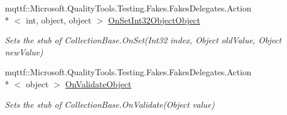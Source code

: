 \begin{DoxyCompactItemize}
mqttf\-::\-Microsoft.\-Quality\-Tools.\-Testing.\-Fakes.\-Fakes\-Delegates.\-Action\\*
$<$ int, object, object $>$ \hyperlink{class_system_1_1_security_1_1_cryptography_1_1_x509_certificates_1_1_fakes_1_1_stub_x509_certificate2_collection_a1aa75c2c759be2e9b4ecc430de4595ac}{On\-Set\-Int32\-Object\-Object}
\begin{DoxyCompactList}\small\item\em Sets the stub of Collection\-Base.\-On\-Set(\-Int32 index, Object old\-Value, Object new\-Value)\end{DoxyCompactList}\item 
mqttf\-::\-Microsoft.\-Quality\-Tools.\-Testing.\-Fakes.\-Fakes\-Delegates.\-Action\\*
$<$ object $>$ \hyperlink{class_system_1_1_security_1_1_cryptography_1_1_x509_certificates_1_1_fakes_1_1_stub_x509_certificate2_collection_ab3aa935b2ce2db5bff05113722a463a7}{On\-Validate\-Object}
\begin{DoxyCompactList}\small\item\em Sets the stub of Collection\-Base.\-On\-Validate(\-Object value)\end{DoxyCompactList}\end{DoxyCompactItemize}
